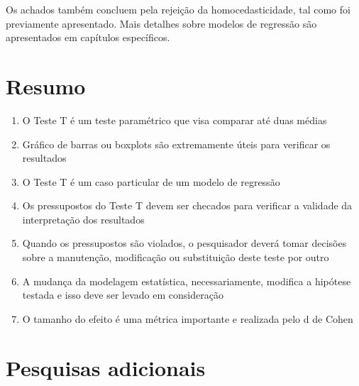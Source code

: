 \documentclass[
]{book}
\providecommand{\tightlist}{%
  \setlength{\itemsep}{0pt}\setlength{\parskip}{0pt}}
\begin{document}
Os achados também concluem pela rejeição da homocedasticidade, tal como
foi previamente apresentado. Mais detalhes sobre modelos de regressão
são apresentados em capítulos específicos.

\hypertarget{resumo-5}{%
\section{Resumo}\label{resumo-5}}

\begin{explore}

\begin{enumerate}
\def\labelenumi{\arabic{enumi}.}
\tightlist
\item
  O Teste T é um teste paramétrico que visa comparar até duas médias\\
\item
  Gráfico de barras ou boxplots são extremamente úteis para verificar os
  resultados\\
\item
  O Teste T é um caso particular de um modelo de regressão\\
\item
  Os pressupostos do Teste T devem ser checados para verificar a
  validade da interpretação dos resultados\\
\item
  Quando os pressupostos são violados, o pesquisador deverá tomar
  decisões sobre a manutenção, modificação ou substituição deste teste
  por outro\\
\item
  A mudança da modelagem estatística, necessariamente, modifica a
  hipótese testada e isso deve ser levado em consideração\\
\item
  O tamanho do efeito é uma métrica importante e realizada pelo d de
  Cohen\\
\end{enumerate}

\end{explore}

\hypertarget{pesquisas-adicionais-2}{%
\section{Pesquisas adicionais}\label{pesquisas-adicionais-2}}
\end{document}

